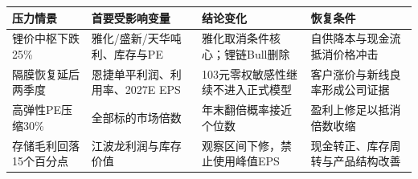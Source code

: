 \begin{exhibitbox}
\small
\begin{tabularx}{\exhibitboxwidth}{L{3cm} L{3.6cm} X X}
\toprule
压力情景 & 首要受影响变量 & 结论变化 & 恢复条件 \\
\midrule
锂价中枢下跌25\% & 雅化/盛新/天华吨利、库存与PE & 雅化取消条件核心；锂链Bull删除 & 自供降本与现金流抵消价格冲击 \\
隔膜恢复延后两季度 & 恩捷单平利润、利用率、2027E EPS & 103元零权敏感性继续不进入正式模型 & 客户涨价与新线良率形成公司证据 \\
高弹性PE压缩30\% & 全部标的市场倍数 & 年末翻倍概率接近个位数 & 盈利上修足以抵消倍数收缩 \\
存储毛利回落15个百分点 & 江波龙利润与库存价值 & 观察区间下修，禁止使用峰值EPS & 现金转正、库存周转与产品结构改善 \\
\bottomrule
\end{tabularx}
\end{exhibitbox}

\clearpage
